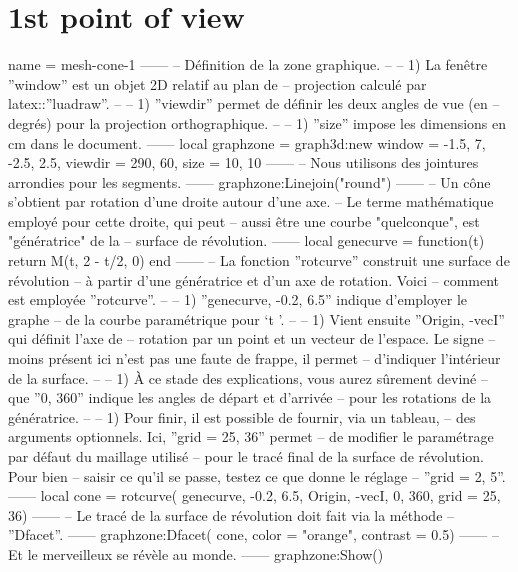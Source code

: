 \documentclass[varwidth, border = 3pt]{standalone}
\begin{document}
\section*{1st point of view}

\begin{luadraw}{name = mesh-cone-1}
------
-- Définition de la zone graphique.
--
--     1) La fenêtre ''window'' est un objet 2D relatif au plan de
--     projection calculé par latex::''luadraw''.
--
--     1) ''viewdir'' permet de définir les deux angles de vue (en
--     degrés) pour la projection orthographique.
--
--     1) ''size'' impose les dimensions en cm dans le document.
------
    local graphzone = graph3d:new{
        window  = {-1.5, 7, -2.5, 2.5},
        viewdir = {290, 60},
        size    = {10, 10}
    }
------
-- Nous utilisons des jointures arrondies pour les segments.
------
    graphzone:Linejoin("round")
------
-- Un cône s'obtient par rotation d'une droite autour d'une axe.
-- Le terme mathématique employé pour cette droite, qui peut
-- aussi être une courbe "quelconque", est "génératrice" de la
-- surface de révolution.
------
    local genecurve = function(t)
        return M(t, 2 - t/2, 0)
    end
------
-- La fonction ''rotcurve'' construit une surface de révolution
-- à partir d'une génératrice et d'un axe de rotation. Voici
-- comment est employée ''rotcurve''.
--
--     1) ''genecurve, -0.2, 6.5'' indique d'employer le graphe
--     de la courbe paramétrique pour `t \in [-0.2 .. 6.5]'.
--
--     1) Vient ensuite ''{Origin, -vecI}'' qui définit l'axe de
--     rotation par un point et un vecteur de l'espace. Le signe
--     moins présent ici n'est pas une faute de frappe, il permet
--     d'indiquer l'intérieur de la surface.
--
--     1) À ce stade des explications, vous aurez sûrement deviné
--     que ''0, 360'' indique les angles de départ et d'arrivée
--     pour les rotations de la génératrice.
--
--     1) Pour finir, il est possible de fournir, via un tableau,
--     des arguments optionnels. Ici, ''grid = {25, 36}'' permet
--     de modifier le paramétrage par défaut du maillage utilisé
--     pour le tracé final de la surface de révolution. Pour bien
--     saisir ce qu'il se passe, testez ce que donne le réglage
--     ''grid = {2, 5}''.
------
    local cone = rotcurve(
        genecurve, -0.2, 6.5,
        {Origin, -vecI},
        0, 360,
        {grid = {25, 36}})
------
-- Le tracé de la surface de révolution doit fait via la méthode
-- ''Dfacet''.
------
    graphzone:Dfacet(
   	    cone,
        {color    = "orange",
		 contrast = 0.5})
------
-- Et le merveilleux se révèle au monde.
------
    graphzone:Show()
\end{luadraw}
\end{document}
